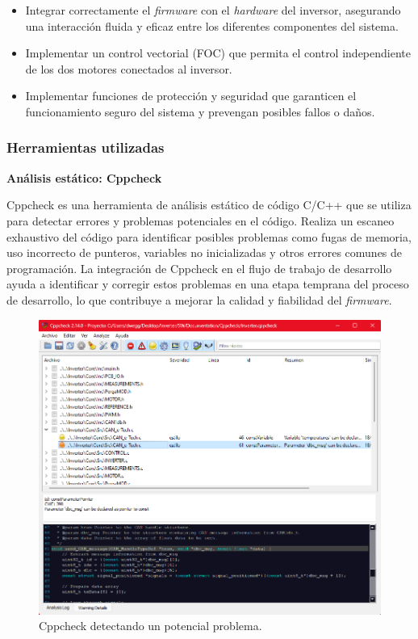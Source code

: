 \begin{itemize}
	\item Integrar correctamente el \textit{firmware} con el \textit{hardware} del inversor, asegurando una interacción fluida y eficaz entre los diferentes componentes del sistema.
	\item Implementar un control vectorial (FOC) que permita el control independiente de los dos motores conectados al inversor.
	\item Implementar funciones de protección y seguridad que garanticen el funcionamiento seguro del sistema y prevengan posibles fallos o daños.
\end{itemize}

\subsubsection{Herramientas utilizadas}

\textbf{Análisis estático: Cppcheck}

Cppcheck es una herramienta de análisis estático de código C/C++ que se utiliza para detectar errores y problemas potenciales en el código. Realiza un escaneo exhaustivo del código para identificar posibles problemas como fugas de memoria, uso incorrecto de punteros, variables no inicializadas y otros errores comunes de programación. La integración de Cppcheck en el flujo de trabajo de desarrollo ayuda a identificar y corregir estos problemas en una etapa temprana del proceso de desarrollo, lo que contribuye a mejorar la calidad y fiabilidad del \textit{firmware}.
\begin{figure}[H]
	\centering
	\includegraphics[width=0.7\linewidth]{fig/cppCheck}
	\caption{Cppcheck detectando un potencial problema.}
\end{figure}

